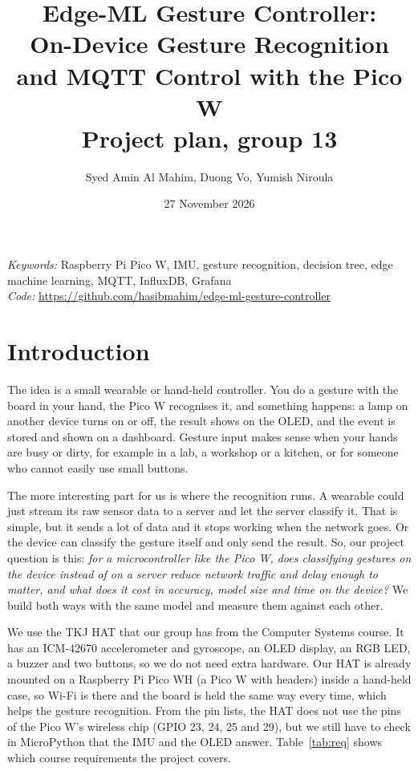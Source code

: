 \documentclass{article}
\title{Edge-ML Gesture Controller:\\ On-Device Gesture Recognition and MQTT Control with the Pico W\\[4pt]
\large Project plan, group 13}
\author{Syed Amin Al Mahim, Duong Vo, Yumish Niroula}
\date{27 November 2026}
\begin{document}
\maketitle

\noindent\textit{Keywords:} Raspberry Pi Pico W, IMU, gesture recognition, decision tree, edge machine learning, MQTT, InfluxDB, Grafana\\
\noindent\textit{Code:} \url{https://github.com/hasibmahim/edge-ml-gesture-controller}

\section{Introduction}

The idea is a small wearable or hand-held controller. You do a gesture with the board in your hand, the Pico W recognises it, and something happens: a lamp on another device turns on or off, the result shows on the OLED, and the event is stored and shown on a dashboard. Gesture input makes sense when your hands are busy or dirty, for example in a lab, a workshop or a kitchen, or for someone who cannot easily use small buttons.

The more interesting part for us is where the recognition runs. A wearable could just stream its raw sensor data to a server and let the server classify it. That is simple, but it sends a lot of data and it stops working when the network goes. Or the device can classify the gesture itself and only send the result. So, our project question is this: \emph{for a microcontroller like the Pico W, does classifying gestures on the device instead of on a server reduce network traffic and delay enough to matter, and what does it cost in accuracy, model size and time on the device?} We build both ways with the same model and measure them against each other.

We use the TKJ HAT that our group has from the Computer Systems course. It has an ICM-42670 accelerometer and gyroscope, an OLED display, an RGB LED, a buzzer and two buttons, so we do not need extra hardware. Our HAT is already mounted on a Raspberry Pi Pico WH (a Pico W with headers) inside a hand-held case, so Wi-Fi is there and the board is held the same way every time, which helps the gesture recognition. From the pin lists, the HAT does not use the pins of the Pico W's wireless chip (GPIO 23, 24, 25 and 29), but we still have to check in MicroPython that the IMU and the OLED answer. Table~\ref{tab:req} shows which course requirements the project covers.
\end{document}
